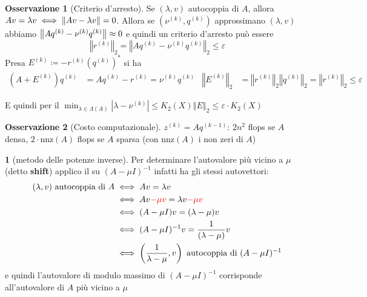 \documentclass[a4paper,10pt]{article}
\theoremstyle{definition}
\theoremstyle{indentdefinition}
\theoremstyle{indenttheorem}
\theoremstyle{myremark}
\newtheorem*{rem*}{Osservazione}
\theoremstyle{indentgeneral}
\newtheorem{lyxalgorithm}[thm]{\protect\algorithmname}
\theoremstyle{plain}
\theoremstyle{plain}
\begin{document}
\begin{rem*}[Criterio d'arresto] Se $(\lambda, v)$ autocoppia di $A$, allora $Av=\lambda v\iff \norm{Av-\lambda v}=0$. Allora se $(\nu^{(k)},q^{(k)})$ approssimano $(\lambda, v)$ abbiamo $\norm{Aq^{(k)}-\nu^{(k)}q^{(k)}}\approx 0$ e quindi un criterio d'arresto può essere
$$\left\Vert r^{\left(k\right)}\right\Vert _{2}=\left\Vert Aq^{\left(k\right)}-\nu^{\left(k\right)}q^{\left(k\right)}\right\Vert _{2}\leq\varepsilon$$
Presa $E^{\left(k\right)}\coloneqq-r^{\left(k\right)}\left(q^{\left(k\right)}\right)^{*}$
si ha
\begin{align*}
\left(A+E^{\left(k\right)}\right)q^{\left(k\right)} & =Aq^{\left(k\right)}-r^{\left(k\right)}=\nu^{\left(k\right)}q^{\left(k\right)} & \left\Vert E^{\left(k\right)}\right\Vert _{2} & =\left\Vert r^{\left(k\right)}\right\Vert _{2}\left\Vert q^{\left(k\right)}\right\Vert _{2}=\left\Vert r^{\left(k\right)}\right\Vert _{2}\leq\varepsilon
\end{align*}

E quindi per il  $\min_{\lambda\in\Lambda\left(A\right)}\left|\lambda-\nu^{\left(k\right)}\right|\leq K_{2}\left(X\right)\left\Vert E\right\Vert _{2}\leq\varepsilon\cdot K_{2}\left(X\right)$
\end{rem*}

\begin{rem*}[Costo computazionale]
    $z^{(k)}=Aq^{(k-1)}$: $2n^2$ flops se $A$ densa, $2\cdot\text{nnz}(A)$ flops se $A$ sparsa (con $\text{nnz}(A)$ i non zeri di $A$)
\end{rem*}


\begin{lyxalgorithm}[metodo delle potenze inverse]
\label{def:metodo-delle-potenze-inverse}Per determinare l'autovalore
più vicino a $\mu$ (detto \textbf{shift}) applico il 
su $\left(A-\mu I\right)^{-1}$ infatti ha gli stessi autovettori:
\begin{align*}
    (\lambda,v)\text{ autocoppia di $A$} &\iff Av=\lambda v\\
    &\iff  Av\textcolor{red}{-\mu v}=\lambda v \textcolor{red}{-\mu v} \\
    &\iff (A-\mu I)v=(\lambda-\mu)v \\
    &\iff  (A-\mu I)^{-1}v=\frac{1}{(\lambda-\mu)}v\\
    &\iff \left(\frac{1}{\lambda-\mu},v\right)  \text{ autocoppia di }(A-\mu I)^{-1}
\end{align*}
e quindi l'autovalore di modulo massimo di $(A-\mu I)^{-1}$ corrisponde all'autovalore di $A$ più vicino a $\mu$
\end{lyxalgorithm}
\end{document}
